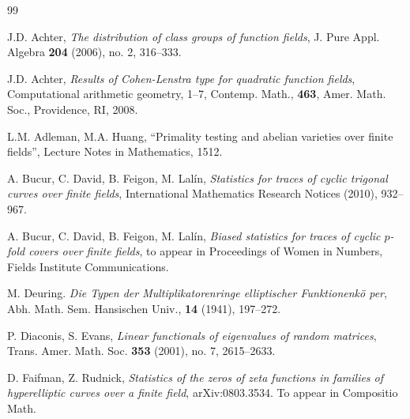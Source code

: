 \documentclass[12pt]{amsart}
\theoremstyle{plain}
\begin{document}
\begin{thebibliography}{99}

 J.D. Achter, \emph{The distribution of class groups of function fields}, J. Pure Appl. Algebra {\bf 204} (2006),  no. 2, 316--333.

 J.D. Achter, \emph{Results of Cohen-Lenstra type for quadratic function fields}, Computational arithmetic geometry, 1--7, Contemp. Math., {\bf 463}, Amer. Math. Soc., Providence, RI, 2008.


 L.M. Adleman, M.A. Huang, ``Primality testing and abelian varieties over finite fields'', Lecture Notes in Mathematics, 1512.



 A. Bucur, C. David, B. Feigon, M. Lal\'in, \emph{Statistics for traces of cyclic trigonal curves over finite fields}, International Mathematics Research Notices (2010), 932--967.

 A. Bucur, C. David, B. Feigon, M. Lal\'in, \emph{Biased statistics for traces of cyclic $p$-fold covers over finite fields}, to appear in Proceedings of Women in Numbers, Fields Institute Communications.


 M. Deuring. \emph{Die Typen der Multiplikatorenringe elliptischer Funktionenk\"o per}, Abh. Math. Sem. Hansischen Univ., {\bf 14} (1941), 197--272.


 P. Diaconis, S. Evans, \emph{Linear functionals of eigenvalues of random matrices}, Trans. Amer. Math. Soc. {\bf 353} (2001), no. 7, 2615--2633.

 D. Faifman, Z. Rudnick, \emph{Statistics of the zeros of zeta functions in families of hyperelliptic curves over a finite field}, arXiv:0803.3534. To appear in Compositio Math.



\end{thebibliography}
\end{document}
